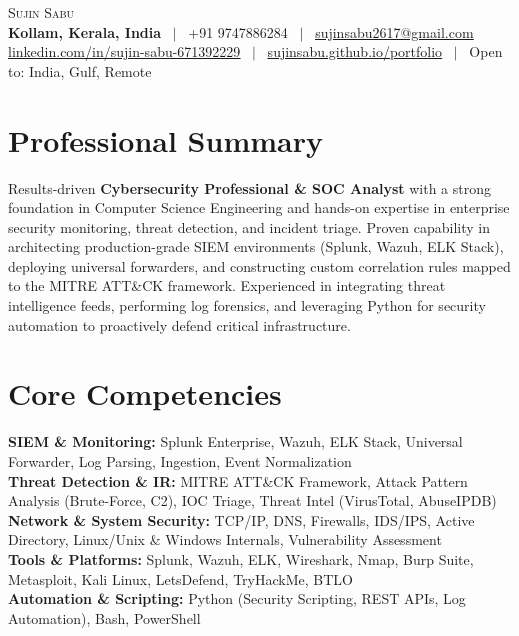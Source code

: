 \documentclass[letterpaper,10pt]{article}
\begin{document}
\begin{center}
    {\Huge \scshape Sujin Sabu} \\ \vspace{3pt}
    \small \textbf{Kollam, Kerala, India} \ $|$ \ +91 9747886284 \ $|$ \ \href{mailto:sujinsabu2617@gmail.com}{\underline{sujinsabu2617@gmail.com}} \\ \vspace{2pt}
    \small \href{https://www.linkedin.com/in/sujin-sabu-671392229}{\underline{linkedin.com/in/sujin-sabu-671392229}} \ $|$ \ \href{https://sujinsabu.github.io/portfolio/}{\underline{sujinsabu.github.io/portfolio}} \ $|$ \ Open to: India, Gulf, Remote
\end{center}

\section{Professional Summary}
\small{
Results-driven \textbf{Cybersecurity Professional \& SOC Analyst} with a strong foundation in Computer Science Engineering and hands-on expertise in enterprise security monitoring, threat detection, and incident triage. Proven capability in architecting production-grade SIEM environments (Splunk, Wazuh, ELK Stack), deploying universal forwarders, and constructing custom correlation rules mapped to the MITRE ATT\&CK framework. Experienced in integrating threat intelligence feeds, performing log forensics, and leveraging Python for security automation to proactively defend critical infrastructure.
}

\section{Core Competencies}
\begin{itemize}[leftmargin=0.15in, label={}]
    \small{\item{
     \textbf{SIEM \& Monitoring:} Splunk Enterprise, Wazuh, ELK Stack, Universal Forwarder, Log Parsing, Ingestion, Event Normalization \\
     \textbf{Threat Detection \& IR:} MITRE ATT\&CK Framework, Attack Pattern Analysis (Brute-Force, C2), IOC Triage, Threat Intel (VirusTotal, AbuseIPDB) \\
     \textbf{Network \& System Security:} TCP/IP, DNS, Firewalls, IDS/IPS, Active Directory, Linux/Unix \& Windows Internals, Vulnerability Assessment \\
     \textbf{Tools \& Platforms:} Splunk, Wazuh, ELK, Wireshark, Nmap, Burp Suite, Metasploit, Kali Linux, LetsDefend, TryHackMe, BTLO \\
     \textbf{Automation \& Scripting:} Python (Security Scripting, REST APIs, Log Automation), Bash, PowerShell
    }}
\end{itemize}
\end{document}
